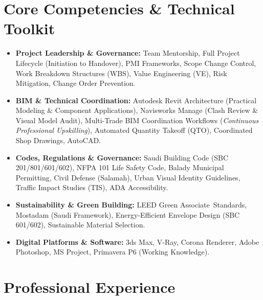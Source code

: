 \documentclass[a4paper,10pt]{article}
\begin{document}
\section{Core Competencies \& Technical Toolkit}
\small
\begin{itemize}[leftmargin=10pt, label={$\bullet$}]
    \item \textbf{Project Leadership \& Governance:} Team Mentorship, Full Project Lifecycle (Initiation to Handover), PMI Frameworks, Scope Change Control, Work Breakdown Structures (WBS), Value Engineering (VE), Risk Mitigation, Change Order Prevention.
    \item \textbf{BIM \& Technical Coordination:} Autodesk Revit Architecture (Practical Modeling \& Component Applications), Navisworks Manage (Clash Review \& Visual Model Audit), Multi-Trade BIM Coordination Workflows (\textit{Continuous Professional Upskilling}), Automated Quantity Takeoff (QTO), Coordinated Shop Drawings, AutoCAD.
    \item \textbf{Codes, Regulations \& Governance:} Saudi Building Code (SBC 201/801/601/602), NFPA 101 Life Safety Code, Balady Municipal Permitting, Civil Defense (Salamah), Urban Visual Identity Guidelines, Traffic Impact Studies (TIS), ADA Accessibility.
    \item \textbf{Sustainability \& Green Building:} LEED Green Associate\texttrademark\ Standards, Mostadam (Saudi Framework), Energy-Efficient Envelope Design (SBC 601/602), Sustainable Material Selection.
    \item \textbf{Digital Platforms \& Software:} 3ds Max, V-Ray, Corona Renderer, Adobe Photoshop, MS Project, Primavera P6 (Working Knowledge).
\end{itemize}

\section{Professional Experience}
\small
\end{document}

